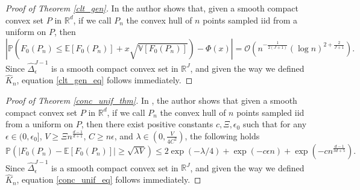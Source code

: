 \documentclass[12pt, reqno]{amsart}
\theoremstyle{definition}
\begin{document}
\begin{proof}[Proof of Theorem \ref{clt_gen}]
In \cite[Theorems 2, 6]{reitzner1} the author shows that, given a smooth compact convex set $P$ in $\mathbb{R}^d$, if we call $P_n$ the convex hull of $n$ points sampled iid from a uniform on $P$, then
$$\left| \mathbb{P} \left( F_0(P_n)\leq \mathbb{E}[F_0(P_n)]+x\sqrt{\mathbb{V}[F_0(P_n)]} \right) - \Phi(x) \right|= \mathcal{O}\left( n^{-\frac{1}{2(J+1)}}\left(\log n\right)^{2+\frac{2}{J+1}} \right).$$
Since $\hat{\Delta}^{J-1}_\epsilon$ is a smooth compact convex set in $\mathbb{R}^J$, and given the way we defined $\hat{K}_n$, equation \eqref{clt_gen_eq} follows immediately.
\end{proof}



\begin{proof}[Proof of Theorem \ref{conc_unif_thm}]
    In \cite[Theorem 2.11, Section 7]{vu}, the author shows that given a smooth compact convex set $P$ in $\mathbb{R}^d$, if we call $P_n$ the convex hull of $n$ points sampled iid from a uniform on $P$, then there exist positive constants $c,\Xi,\epsilon_0$ such that for any $\epsilon\in(0,\epsilon_0]$, $V\geq \Xi n^{\frac{d-1}{d+1}}$, $C\geq n\epsilon$, and $\lambda\in(0,\frac{V}{4C^2})$, the following holds
        $$\mathbb{P}\left( \left| F_0(P_n) -\mathbb{E}[F_0(P_n)] \right| \geq \sqrt{\lambda V} \right) \leq 2 \exp(-\lambda/4)+\exp(-c\epsilon n) + \exp\left(-cn^\frac{d-1}{3d+5}\right).$$
        Since $\hat{\Delta}^{J-1}_\epsilon$ is a smooth compact convex set in $\mathbb{R}^J$, and given the way we defined $\hat{K}_n$, equation \eqref{conc_unif_eq} follows immediately.
\end{proof}
\end{document}
